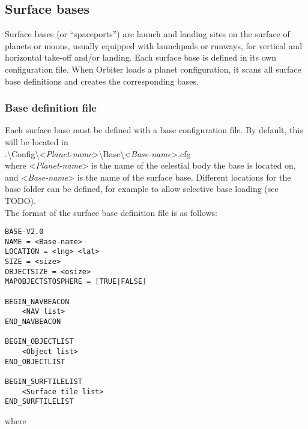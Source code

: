 \documentclass[Orbiter Developer Manual.tex]{subfiles}
\begin{document}
\subsection{Surface bases}
Surface bases (or “spaceports”) are launch and landing sites on the surface of planets or moons, usually equipped with launchpads or runways, for vertical and horizontal take-off and/or landing. Each surface base is defined in its own configuration file. When Orbiter loads a planet configuration, it scans all surface base definitions and creates the corresponding bases.

\subsubsection*{Base definition file}
Each surface base must be defined with a base configuration file. By default, this will be located in\\
\indent .\textbackslash Config\textbackslash <\textit{Planet-name}>\textbackslash Base\textbackslash <\textit{Base-name}>.cfg\\
where <\textit{Planet-name}> is the name of the celestial body the base is located on, and <\textit{Base-name}> is the name of the surface base. Different locations for the base folder can be defined, for example to allow selective base loading (see TODO).\\
The format of the surface base definition file is as follows:

\begin{lstlisting}[language=OSFS]
BASE-V2.0
NAME = <Base-name>
LOCATION = <lng> <lat>
SIZE = <size>
OBJECTSIZE = <osize>
MAPOBJECTSTOSPHERE = [TRUE|FALSE]

BEGIN_NAVBEACON
	<NAV list>
END_NAVBEACON

BEGIN_OBJECTLIST
	<Object list>
END_OBJECTLIST

BEGIN_SURFTILELIST
	<Surface tile list>
END_SURFTILELIST
\end{lstlisting}

\noindent
where
\end{document}

